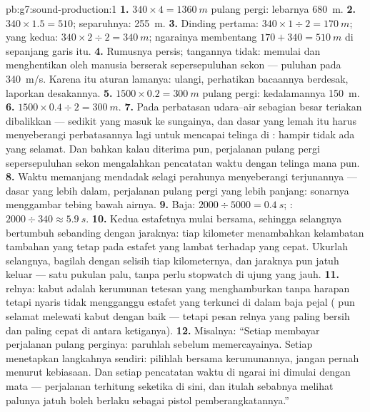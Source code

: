 \begin{solution}{pb:g7:sound-production:1}
\textbf{1.} $340 \times 4 = \qty{1360}{m}$ pulang pergi: lebarnya
\qty{680}{m}.
\textbf{2.} $340 \times 1.5 = 510$; separuhnya: \qty{255}{m}.
\textbf{3.} Dinding pertama: $340 \times 1 \div 2 = \qty{170}{m}$;
yang kedua: $340 \times 2 \div 2 = \qty{340}{m}$; ngarainya
membentang $170 + 340 = \qty{510}{m}$ di sepanjang garis itu.
\textbf{4.} Rumusnya persis; tangannya tidak: memulai dan menghentikan
oleh manusia berserak sepersepuluhan sekon --- puluhan  pada
\qty{340}{m/s}. Karena itu aturan lamanya: ulangi, perhatikan
bacaannya berdesak, laporkan desakannya.
\textbf{5.} $1500 \times 0.2 = \qty{300}{m}$ pulang pergi:
kedalamannya \qty{150}{m}.
\textbf{6.} $1500 \times 0.4 \div 2 = \qty{300}{m}$.
\textbf{7.} Pada perbatasan udara--air sebagian besar teriakan
dibalikkan --- sedikit yang masuk ke sungainya, dan  dasar yang
lemah itu harus menyeberangi perbatasannya lagi untuk mencapai telinga
di : hampir tidak ada yang selamat. Dan bahkan kalau 
diterima pun, perjalanan pulang pergi sepersepuluhan sekon
mengalahkan pencatatan waktu dengan telinga mana pun.
\textbf{8.} Waktu  memanjang mendadak selagi perahunya
menyeberangi terjunannya --- dasar yang lebih dalam, perjalanan pulang
pergi yang lebih panjang: sonarnya menggambar tebing bawah airnya.
\textbf{9.} Baja: $2000 \div 5000 = \qty{0.4}{s}$; : $2000
\div 340 \approx \qty{5.9}{s}$.
\textbf{10.} Kedua estafetnya mulai bersama, sehingga selangnya
bertumbuh sebanding dengan jaraknya: tiap kilometer menambahkan
kelambatan tambahan yang tetap pada estafet yang lambat terhadap yang
cepat. Ukurlah selangnya, bagilah dengan selisih tiap kilometernya,
dan jaraknya pun jatuh keluar --- satu pukulan palu, tanpa perlu
stopwatch di ujung yang jauh.
\textbf{11.}  relnya: kabut adalah kerumunan tetesan yang
menghamburkan \emph{} tanpa harapan tetapi nyaris tidak
mengganggu estafet yang terkunci di dalam baja pejal ( 
pun selamat melewati kabut dengan baik --- tetapi pesan relnya yang
paling bersih dan paling cepat di antara ketiganya).
\textbf{12.} Misalnya: ``Setiap  membayar perjalanan pulang
perginya: paruhlah sebelum memercayainya. Setiap  menetapkan
langkahnya sendiri: pilihlah  bersama kerumunannya, jangan
pernah menurut kebiasaan. Dan setiap pencatatan waktu di ngarai ini
dimulai dengan mata --- perjalanan  terhitung seketika di sini,
dan itulah sebabnya melihat palunya jatuh boleh berlaku sebagai pistol
pemberangkatannya.''
\end{solution}
